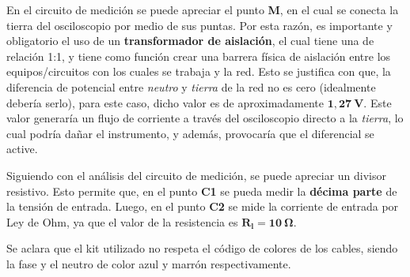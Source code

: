     En el circuito de medición se puede apreciar el punto \textbf{M}, en el cual se conecta la tierra del osciloscopio
    por medio de sus puntas. Por esta razón, es importante y obligatorio el uso de un \textbf{transformador de aislación},
    el cual tiene una de relación 1:1, y tiene como función crear una barrera física de aislación
    entre los equipos/circuitos con los cuales se trabaja y la red. Esto se justifica con que, la diferencia de
    potencial entre \textit{neutro} y \textit{tierra} de la red no es cero (idealmente debería serlo), para este caso, dicho
    valor es de aproximadamente $\mathbf{1,27\ V}$. Este valor generaría un flujo de corriente a través del osciloscopio 
    directo a la \textit{tierra}, lo cual podría dañar el instrumento, y además, provocaría que el diferencial se active.

    Siguiendo con el análisis del circuito de medición, se puede apreciar un divisor resistivo. Esto permite que, en el
    punto \textbf{C1} se pueda medir la \textbf{décima parte} de la tensión de entrada. Luego, en el punto \textbf{C2} 
    se mide la corriente de entrada por Ley de Ohm, ya que el valor de la resistencia es $\mathbf{R_l=10\ \Omega}$.
    
    Se aclara que el kit utilizado no respeta el código de colores de los cables, siendo la fase y el neutro de color azul
    y marrón respectivamente.

    
    

